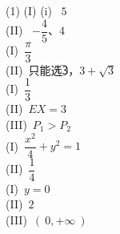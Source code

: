 \documentclass[11pt,a4paper]{ctexart}
\begin{document}
    \begin{tasks}[label=(\arabic*), after-item-skip=0.6em,start=16] (1)
        \task 
        (I) (i) \ $5$\\[0.6em]
        (II) \ $-\dfrac{4}{5}$、$4$ \\

        \task
        (I)\ $\dfrac{\pi}{3}$\\[0.6em]
        (II)\ 只能选\textcircled{3}，$3+\sqrt{3}$ \\

        \task
        (I)\ $\dfrac{1}{3}$ \\[0.6em]
        (II)\ $EX=3$\\[0.6em]
        (III)\ $P_1>P_2$\\

        \task
        (I)\ $\dfrac{x^2}{4}+y^2= 1$ \\[0.6em]
        (II)\ $\dfrac{1}{4}$\\
        
        \task
        (I)\ $y=0$\\[0.6em]
        (II)\ $2$\\[0.6em]
        (III)\ $(\ 0,+\infty\ )$
    
    \end{tasks}

\vfill
\end{document}
